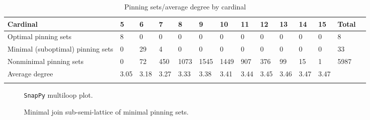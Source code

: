 \documentclass{article}%
\begin{document}
\begin{table}[ht]
	\caption{Pinning sets/average degree by cardinal}
	\centering
	\renewcommand{\arraystretch}{1.5}
	\begin{tabularx}{\textwidth}{lXXXXXXXXXXXXX}
		\toprule
			Cardinal & 5 & 6 & 7 & 8 & 9 & 10 & 11 & 12 & 13 & 14 & 15 & Total\\
			\hline
			Optimal pinning sets & 8 & 0 & 0 & 0 & 0 & 0 & 0 & 0 & 0 & 0 & 0 & 8 \\
			Minimal (suboptimal) pinning sets & 0 & 29 & 4 & 0 & 0 & 0 & 0 & 0 & 0 & 0 & 0 & 33 \\
			Nonminimal pinning sets & 0 & 72 & 450 & 1073 & 1545 & 1449 & 907 & 376 & 99 & 15 & 1 & 5987 \\
			Average degree & 3.05 & 3.18 & 3.27 & 3.33 & 3.38 & 3.41 & 3.44 & 3.45 & 3.46 & 3.47 & 3.47 &  \\
		\bottomrule \\ 
	\end{tabularx}
\end{table}

\begin{multicols}{2}
\begin{figure}[H]
\centering

\caption{\texttt{SnapPy} multiloop plot.}
\label{fig:tex/img/[[6, 26, 1, 7], [7, 20, 8, 21], [15, 5, 16, 6], [25, 10, 26, 11], [1, 19, 2, 20], [8, 2, 9, 3], [21, 14, 22, 15], [22, 4, 23, 5], [16, 12, 17, 11], [17, 24, 18, 25], [18, 9, 19, 10], [3, 13, 4, 14], [.svg}
\end{figure}
\columnbreak

\begin{figure}[H]
\centering
\scalebox{0.8}{}
\caption{Minimal join sub-semi-lattice of minimal pinning sets.}
\label{fig:tex/img/[[6, 26, 1, 7], [7, 20, 8, 21], [15, 5, 16, 6], [25, 10, 26, 11], [1, 19, 2, 20], [8, 2, 9, 3], [21, 14, 22, 15], [22, 4, 23, 5], [16, 12, 17, 11], [17, 24, 18, 25], [18, 9, 19, 10], [3, 13, 4, 14], [.pgf}
\end{figure}
\end{multicols}
\end{document}
